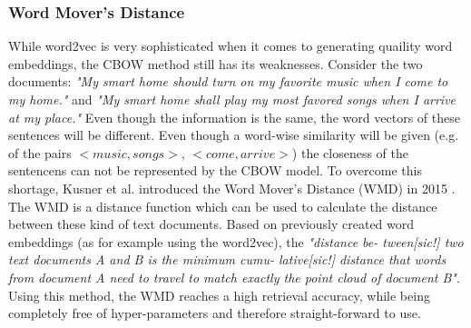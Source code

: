 \subsubsection{Word Mover's Distance} %
\label{sub:word_movers_distance}
While word2vec is very sophisticated when it comes to generating quaility word embeddings, the CBOW method still has its weaknesses. Consider the two documents: \emph{"My smart home should turn on my favorite music when I come to my home."} and \emph{"My smart home shall play my most favored songs when I arrive at my place."} Even though the information is the same, the word vectors of these sentences will be different. Even though a word-wise similarity will be given (e.g. of the pairs $< music, songs>$, $<come, arrive>$) the closeness of the sentencens can not be represented by the CBOW model. To overcome this shortage, Kusner et al. introduced the Word Mover's Distance (WMD) in 2015 \cite{kusner_word_2015}. The WMD is a distance function which can be used to calculate the distance between these kind of text documents. Based on previously created word embeddings (as for example using the word2vec), the \textit{"distance be- tween[sic!] two text documents A and B is the minimum cumu- lative[sic!] distance that words from document A need to travel to match exactly the point cloud of document B"}\cite[p2]{kusner_word_2015}. Using this method, the WMD reaches a high retrieval accuracy, while being completely free of hyper-parameters and therefore straight-forward to use.